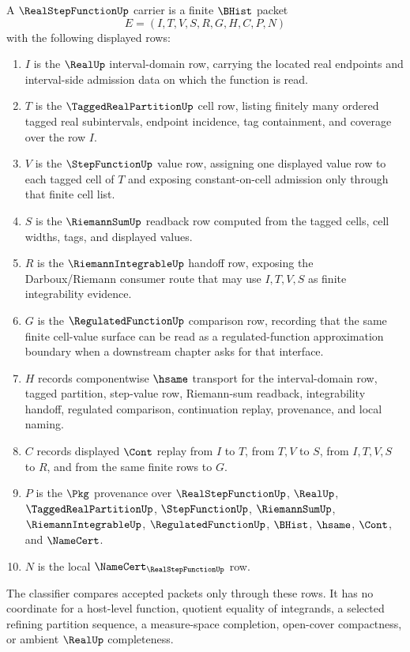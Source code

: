 \begin{definition}
\label{def:real-step-function-carrier}
A $\RealStepFunctionUp$ carrier is a finite $\BHist$ packet
$$
E=(I,T,V,S,R,G,H,C,P,N)
$$
with the following displayed rows:
\begin{enumerate}
\item $I$ is the $\RealUp$ interval-domain row, carrying the located real endpoints and interval-side admission data on which the function is read.
\item $T$ is the $\TaggedRealPartitionUp$ cell row, listing finitely many ordered tagged real subintervals, endpoint incidence, tag containment, and coverage over the row $I$.
\item $V$ is the $\StepFunctionUp$ value row, assigning one displayed value row to each tagged cell of $T$ and exposing constant-on-cell admission only through that finite cell list.
\item $S$ is the $\RiemannSumUp$ readback row computed from the tagged cells, cell widths, tags, and displayed values.
\item $R$ is the $\RiemannIntegrableUp$ handoff row, exposing the Darboux/Riemann consumer route that may use $I,T,V,S$ as finite integrability evidence.
\item $G$ is the $\RegulatedFunctionUp$ comparison row, recording that the same finite cell-value surface can be read as a regulated-function approximation boundary when a downstream chapter asks for that interface.
\item $H$ records componentwise $\hsame$ transport for the interval-domain row, tagged partition, step-value row, Riemann-sum readback, integrability handoff, regulated comparison, continuation replay, provenance, and local naming.
\item $C$ records displayed $\Cont$ replay from $I$ to $T$, from $T,V$ to $S$, from $I,T,V,S$ to $R$, and from the same finite rows to $G$.
\item $P$ is the $\Pkg$ provenance over $\RealStepFunctionUp$, $\RealUp$, $\TaggedRealPartitionUp$, $\StepFunctionUp$, $\RiemannSumUp$, $\RiemannIntegrableUp$, $\RegulatedFunctionUp$, $\BHist$, $\hsame$, $\Cont$, and $\NameCert$.
\item $N$ is the local $\NameCert_{\RealStepFunctionUp}$ row.
\end{enumerate}
The classifier compares accepted packets only through these rows. It has no coordinate for a host-level function, quotient equality of integrands, a selected refining partition sequence, a measure-space completion, open-cover compactness, or ambient $\RealUp$ completeness.
\end{definition}

